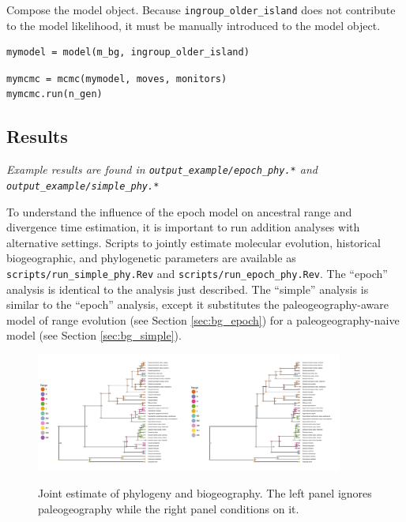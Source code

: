 Compose the model object.
Because {\tt ingroup\_older\_island} does not contribute to the model likelihood, it must be manually introduced to the model object.

\begin{snugshade}
\begin{lstlisting}
mymodel = model(m_bg, ingroup_older_island)
\end{lstlisting}
\end{snugshade}


\begin{snugshade}
\begin{lstlisting}
mymcmc = mcmc(mymodel, moves, monitors)
mymcmc.run(n_gen)
\end{lstlisting}
\end{snugshade}


\subsection*{Results}

{\it Example results are found in {\tt output\_example/epoch\_phy.*} and {\tt output\_example/simple\_phy.*} }

To understand the influence of the epoch model on ancestral range and divergence time estimation, it is important to run addition analyses with alternative settings.
Scripts to jointly estimate molecular evolution, historical biogeographic, and phylogenetic parameters are available as {\tt scripts/run\_simple\_phy.Rev} and {\tt scripts/run\_epoch\_phy.Rev}.
The ``epoch'' analysis is identical to the analysis just described.
The ``simple'' analysis is similar to the ``epoch'' analysis, except it substitutes the paleogeography-aware model of range evolution (see Section \ref{sec:bg_epoch}) for a paleogeography-naive model (see Section \ref{sec:bg_simple}).

\begin{figure}[!ht]
\centering
\includegraphics[width=0.45\textwidth]{figures/fig_simple_phy_RevGadgets_ase.pdf}\includegraphics[width=0.45\textwidth]{figures/fig_epoch_phy_RevGadgets_ase.pdf} 
\caption{Joint estimate of phylogeny and biogeography. The left panel ignores paleogeography while the right panel conditions on it.}
\label{fig:epoch_phy}
\end{figure}

